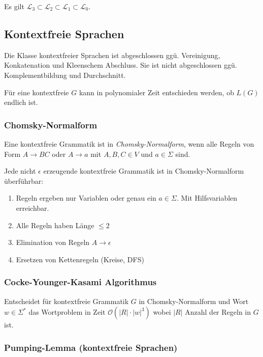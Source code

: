 Es gilt $\mathcal{L}_3 \subset \mathcal{L}_2 \subset \mathcal{L}_1 \subset \mathcal{L}_0$.

\subsection*{Kontextfreie Sprachen}

Die Klasse kontextfreier Sprachen ist abgeschlossen ggü. Vereinigung, Konkatenation und Kleenschem Abschluss. Sie ist nicht abgeschlossen ggü. Komplementbildung und Durchschnitt.

\spacing

Für eine kontextfreie $G$ kann in polynomialer Zeit entschieden werden, ob $L(G)$ endlich ist.

\subsubsection*{Chomsky-Normalform}

Eine kontextfreie Grammatik ist in \emph{Chomsky-Normalform}, wenn alle Regeln von Form $A \to BC$ oder $A \to a$ mit $A,B,C \in V$ und $a \in \Sigma$ sind.

\spacing

Jede nicht $\epsilon$ erzeugende kontextfreie Grammatik ist in Chomsky-Normalform überführbar:

\begin{enumerate}
\item Regeln ergeben nur Variablen oder genau ein $a \in \Sigma$. Mit Hilfsvariablen erreichbar.
\item Alle Regeln haben Länge $\leq 2$
\item Elimination von Regeln $A \to \epsilon$
\item Ersetzen von Kettenregeln (Kreise, DFS)
\end{enumerate}

\subsubsection*{Cocke-Younger-Kasami Algorithmus}

Entscheidet für kontextfreie Grammatik $G$ in Chomsky-Normalform und Wort $w \in \Sigma^*$ das Wortproblem in Zeit $\mathcal{O}(|R|\cdot |w|^3)$ wobei $|R|$ Anzahl der Regeln in $G$ ist.

\subsubsection*{Pumping-Lemma (kontextfreie Sprachen)}

